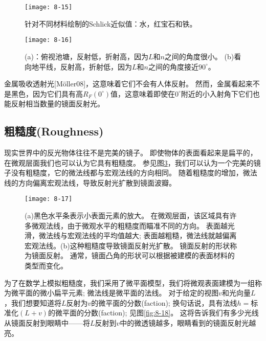 \begin{figure}[h]
    \label{fig:8-15}
    \texttt{[image: 8-15]}
    \centering
    \caption{针对不同材料绘制的Schlick近似值：水，红宝石和铁。}
\end{figure}

\begin{figure}[h]
    \label{fig:8-16}
    \texttt{[image: 8-16]}
    \centering
    \caption{(a)：俯视池塘，反射低，折射高，因为$L$和$n$之间的角度很小。 (b)看向地平线，反射高，折射低，因为$L$和$n$之间的角度接近$90^{\circ}$。}
\end{figure}

\begin{flushleft}
金属吸收透射光[Möller08]，这意味着它们不会有人体反射。 然而，金属看起来不是黑色，因为它们具有高$R_{F}(0^{\circ})$值，这意味着即使在$0^{\circ}$附近的小入射角下它们也能反射相当数量的镜面反射光。\\
\end{flushleft}
\clearpage

\subsection{粗糙度(Roughness)}
\begin{flushleft}
现实世界中的反光物体往往不是完美的镜子。 即使物体的表面看起来是扁平的，在微观层面我们也可以认为它具有粗糙度。 参见图\ref{fig:8-17}，我们可以认为一个完美的镜子没有粗糙度，它的微法线都与宏观法线的方向相同。 随着粗糙度的增加，微法线的方向偏离宏观法线，导致反射光扩散到镜面波瓣。
\end{flushleft}

\begin{figure}[h]
    \label{fig:8-17}
    \texttt{[image: 8-17]}
    \centering
    \caption{(a)黑色水平条表示小表面元素的放大。 在微观层面，该区域具有许多微观法线，由于微观水平的粗糙度而瞄准不同的方向。 表面越光滑，微法线与宏观法线的平均值越大; 表面越粗糙，微法线就越偏离宏观法线。(b)这种粗糙度导致镜面反射光扩散。 镜面反射的形状称为镜面反射。 通常，镜面凸角的形状可以根据被建模的表面材料的类型而变化。}
\end{figure}

\begin{flushleft}
为了在数学上模拟粗糙度，我们采用了微平面模型，我们将微观表面建模为一组称为微平面的微小扁平元素; 微法线是微平面的法线。 对于给定的视图$v$和光向量$L$，我们想要知道将$L$反射为$v$的微平面的分数(faction); 换句话说，具有法线$h=$标准化$(L + v)$的微平面的分数(faction); 见图\ref{fig:8-18}。 这将告诉我们有多少光线从镜面反射到眼睛中——将$L$反射到$v$中的微透镜越多，眼睛看到的镜面反射光越亮。
\end{flushleft}

